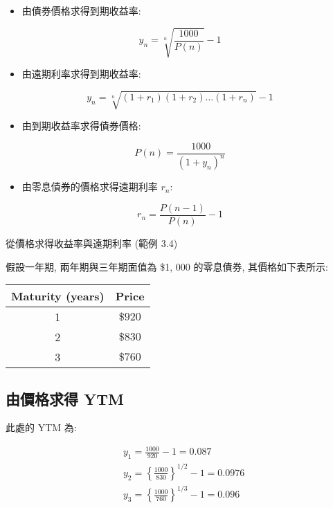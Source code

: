 \documentclass[letterpaper]{article}
\begin{document}
		\begin{itemize}
			\item 由債券價格求得到期收益率: 
		\end{itemize}
		
		$$
		y_{n}=\sqrt[n]{\frac{1000}{P (n) }}-1
		$$
		
		\begin{itemize}
			\item 由遠期利率求得到期收益率: 
		\end{itemize}
		
		$$
		y_{n}=\sqrt[n]{\left (1+r_{1}\right) \left (1+r_{2}\right) \ldots\left (1+r_{n}\right) }-1
		$$
		
		\begin{itemize}
			\item 由到期收益率求得債券價格: 
		\end{itemize}
		
		$$
		P (n) =\frac{1000}{\left (1+y_{n}\right) ^{n}}
		$$
		
		\begin{itemize}
			\item 由零息債券的價格求得遠期利率 $r_{n}$: 
		\end{itemize}
		
		$$
		r_{n}=\frac{P (n-1) }{P (n) }-1
		$$
		
		從價格求得收益率與遠期利率 (範例 3.4) 
		
		假設一年期, 兩年期與三年期面值為 \$1, 000 的零息債券, 其價格如下表所示: 
		\begin{center}
			\begin{tabular}{cc}
				Maturity  (years) & Price \\
				\hline
				1 & $\$ 920$ \\
				2 & $\$ 830$ \\
				3 & $\$ 760$ \\
			\end{tabular}
		\end{center}
		
		\subsection{由價格求得 YTM}
		
		此處的 YTM 為: 
		
		$$
		\begin{aligned}
			& y_{1}=\frac{1000}{920}-1=0.087 \\
			& y_{2}=\left\{\frac{1000}{830}\right\}^{1 / 2}-1=0.0976 \\
			& y_{3}=\left\{\frac{1000}{760}\right\}^{1 / 3}-1=0.096
		\end{aligned}
		$$
		
\end{document}
